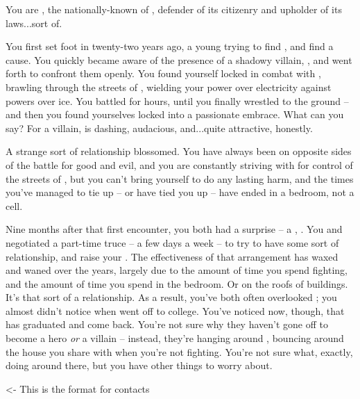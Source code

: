 \documentclass[char]{LRSguildcamp1}
\begin{document}
\name{\cOS{}}
You are \cOS{\intro}, the nationally-known \cOS{\hero} of \pCityO{}, defender of its citizenry and upholder of its laws...sort of.

You first set foot in \pCityO{} twenty-two years ago, a young \cOS{\hero} trying to find \cOS{\themself}, and find a cause.  You quickly became aware of the presence of a shadowy villain, \cOldest{\intro}, and went forth to confront them openly.  You found yourself locked in combat with \cOS{}, brawling through the streets of \pCityO{}, wielding your power over electricity against \cOldest{\their} powers over ice.  You battled for hours, until you finally wrestled \cOldest{\them} to the ground -- and then you found yourselves locked into a passionate embrace.  What can you say?  For a villain, \cOldest{} is dashing, audacious, and...quite attractive, honestly.

A strange sort of relationship blossomed.  You have always been on opposite sides of the battle for good and evil, and you are constantly striving with \cOS{\them} for control of the streets of \pCityO{}, but you can't bring yourself to do \cOS{\them} any lasting harm, and the times you've managed to tie \cOS{\them} up -- or \cOS{\they} have tied you up -- have ended in a bedroom, not a cell.

Nine months after that first encounter, you both had a surprise -- a \cGrad{\offspring}, \cGrad{\intro}.  You and \cOS{} negotiated a part-time truce -- a few days a week -- to try to have some sort of relationship, and raise your \cGrad{\offspring}.  The effectiveness of that arrangement has waxed and waned over the years, largely due to the amount of time you spend fighting, and the amount of time you spend in the bedroom.  Or on the roofs of buildings.  It's that sort of a relationship.  As a result, you've both often overlooked \cGrad{}; you almost didn't notice when \cGrad{} went off to college.  You've noticed now, though, that \cGrad{} has graduated and come back.  You're not sure why they haven't gone off to become a hero \emph{or} a villain -- instead, they're hanging around \pCityO{}, bouncing around the house you share with \cOS{} when you're not fighting.  You're not sure what, exactly, \cGrad{\theyare} doing around there, but you have other things to worry about.

\begin{itemz}[Goals]
	\item 
\end{itemz}

\begin{itemz}[Notes]
	\item 
\end{itemz}

\begin{contacts}
	\contact{} <- This is the format for contacts 
\end{contacts}
\end{document}
